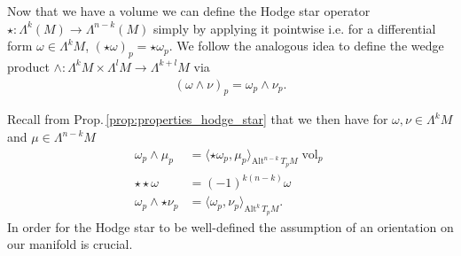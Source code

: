 \documentclass[12pt,a4paper]{article}
\numberwithin{equation}{subsection}
\numberwithin{lemma}{subsection}
\theoremstyle{definition}
\DeclareMathOperator{\vol}{vol}
\newcommand{\alternating}[2]{ {\text{Alt}^{#1}\,#2} }
\newcommand{\real}{\mathbb{R}}
\begin{document}


Now that we have a volume we can define the Hodge star operator
$\star: \Lambda^k(M) \rightarrow \Lambda^{n-k}(M)$ 
simply by applying it 
pointwise i.e. for a differential form $\omega \in \Lambda^k M$, $(\star \omega)_p = \star \omega_p$. 
We follow the analogous idea to define the wedge product
$\wedge: \Lambda^k M \times \Lambda^l M \rightarrow \Lambda^{k+l} M$ via
\begin{align*}
    (\omega \wedge \nu )_p = \omega_p \wedge \nu_p. 
\end{align*} 

Recall from Prop.\,\ref{prop:properties_hodge_star} that we then have for $\omega, \nu \in \Lambda^k M$ and 
$\mu \in \Lambda^{n-k} M$
\begin{align*}
    \omega_p \wedge \mu_p &= \langle \star \omega_p, \mu_p \rangle _{\alternating{n-k}{T_p M}} \vol_p
    \\ \star \star \omega &= (-1)^{k(n-k)} \omega
    \\ \omega_p \wedge \star \nu_p &= \langle \omega_p, \nu_p \rangle _{\alternating{k}{T_p M}}.
\end{align*}
In order for 
the Hodge star to be well-defined the assumption of an orientation on our 
manifold is crucial. 
\end{document}
